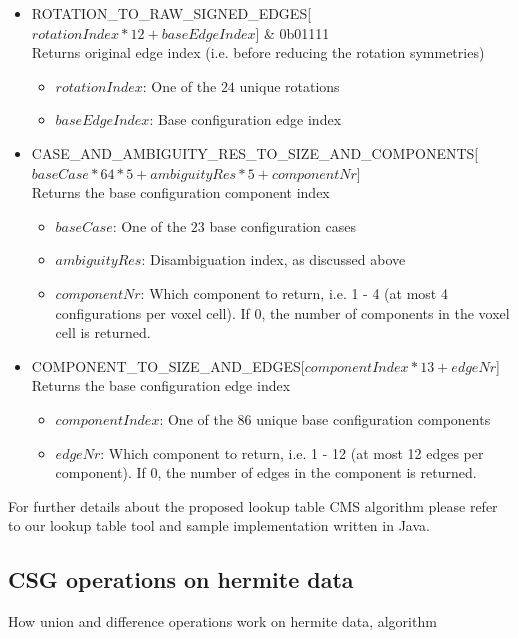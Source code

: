 \begin{itemize}
	\item ROTATION\_TO\_RAW\_SIGNED\_EDGES[$rotationIndex * 12 + baseEdgeIndex$] \& 0b01111\\
	Returns original edge index (i.e. before reducing the rotation symmetries)
	\begin{itemize}
		\item $rotationIndex$: One of the $24$ unique rotations
		\item $baseEdgeIndex$: Base configuration edge index
  \end{itemize}
	
	\item CASE\_AND\_AMBIGUITY\_RES\_TO\_SIZE\_AND\_COMPONENTS[$baseCase * 64 * 5 + ambiguityRes * 5 + componentNr$]\\
	Returns the base configuration component index
	\begin{itemize}
		\item $baseCase$: One of the $23$ base configuration cases
		\item $ambiguityRes$: Disambiguation index, as discussed above
		\item $componentNr$: Which component to return, i.e. 1 - 4 (at most 4 configurations per voxel cell). If 0, the number of components in
		the voxel cell is returned.
  \end{itemize}

	\item COMPONENT\_TO\_SIZE\_AND\_EDGES[$componentIndex * 13 + edgeNr$]\\
	Returns the base configuration edge index
	\begin{itemize}
		\item $componentIndex$: One of the $86$ unique base configuration components
		\item $edgeNr$: Which component to return, i.e. 1 - 12 (at most 12 edges per component). If 0, the number of edges in
		the component is returned.
  \end{itemize}
	
\end{itemize}

For further details about the proposed lookup table CMS algorithm please refer to our lookup table tool and sample implementation written in Java.


\subsection{CSG operations on hermite data}
How union and difference operations work on hermite data, algorithm

